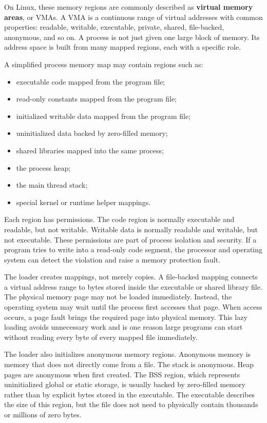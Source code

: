 On Linux, these memory regions are commonly described as \textbf{virtual memory areas}, or VMAs. A VMA is a continuous range of virtual addresses with common properties: readable, writable, executable, private, shared, file-backed, anonymous, and so on. A process is not just given one large block of memory. Its address space is built from many mapped regions, each with a specific role.

A simplified process memory map may contain regions such as:

\begin{itemize}
    \item executable code mapped from the program file;
    \item read-only constants mapped from the program file;
    \item initialized writable data mapped from the program file;
    \item uninitialized data backed by zero-filled memory;
    \item shared libraries mapped into the same process;
    \item the process heap;
    \item the main thread stack;
    \item special kernel or runtime helper mappings.
\end{itemize}

Each region has permissions. The code region is normally executable and readable, but not writable. Writable data is normally readable and writable, but not executable. These permissions are part of process isolation and security. If a program tries to write into a read-only code segment, the processor and operating system can detect the violation and raise a memory protection fault.

The loader creates mappings, not merely copies. A file-backed mapping connects a virtual address range to bytes stored inside the executable or shared library file. The physical memory page may not be loaded immediately. Instead, the operating system may wait until the process first accesses that page. When access occurs, a page fault brings the required page into physical memory. This lazy loading avoids unnecessary work and is one reason large programs can start without reading every byte of every mapped file immediately.

The loader also initializes anonymous memory regions. Anonymous memory is memory that does not directly come from a file. The stack is anonymous. Heap pages are anonymous when first created. The BSS region, which represents uninitialized global or static storage, is usually backed by zero-filled memory rather than by explicit bytes stored in the executable. The executable describes the size of this region, but the file does not need to physically contain thousands or millions of zero bytes.

